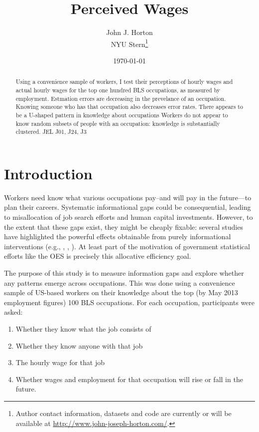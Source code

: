 \documentclass[11pt]{article}
\begin{document}
 

\title{Perceived Wages}

\date{\today}

\author{ John J. Horton \\ NYU Stern\footnote{Author contact information, datasets and code are currently or will be available at \href{http://www.john-joseph-horton.com/}{http://www.john-joseph-horton.com/}. } }
\maketitle

\begin{abstract}
\noindent  Using a convenience sample of workers, I test their perceptions of hourly wages and actual hourly wages for the top one hundred BLS occupations, as measured by employment. 
Estmation errors are decreasing in the prevelance of an occupation. 
Knowing someone who has that occupation also decreases error rates. 
There appears to be a U-shaped pattern in knowledge about occupations
Workers do not appear to know random subsets of people with an occupation: knowledge is substantially clustered. \newline 
\newline 
\noindent JEL J01, J24, J3
\end{abstract} 

\section{Introduction}

Workers need know what various occupations pay--and will pay in the future---to plan their careers. 
Systematic informational gaps could be consequential, leading to misallocation of job search efforts and human capital investments. 
However, to the extent that these gaps exist, they might be cheaply fixable: 
several studies have highlighted the powerful effects obtainable from purely informational interventions (e.g., \cite{jensen2010perceived}, \cite{dupas2009teenagers}, \cite{card2010inequality}). 
At least part of the motivation of government statistical efforts like the OES is precisely this allocative efficiency goal. 

The purpose of this study is to measure information gaps and explore whether any patterns emerge across occupations. 
This was done using a convenience sample of US-based workers on their knowledge about the top (by May 2013 employment figures) 100 BLS occupations.  
For each occupation, participants were asked: 
\begin{enumerate}
\item Whether they know what the job consists of 
\item Whether they know anyone with that job 
\item The hourly wage for that job 
\item Whether wages and employment for that occupation will rise or fall in the future.  
\end{enumerate} 
\end{document}

